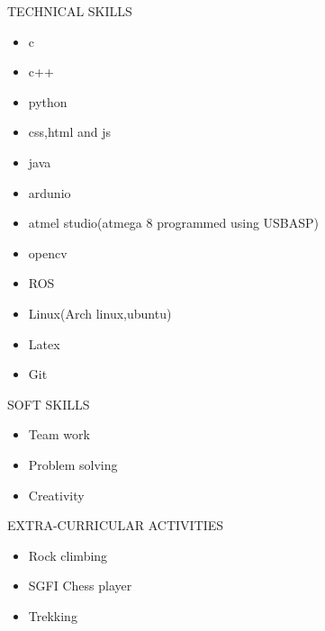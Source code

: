 \documentclass[10pt]{article}
\begin{document}
		
	\begin{minipage}[t][4cm][t]{0.2\textwidth}
		TECHNICAL SKILLS
		
	\end{minipage}
	\begin{minipage}[t][4cm][t]{0.8\textwidth}
		\begin{itemize}
			\item c
			\item c++
			\item python
			\item css,html and js
			\item java
			\item ardunio
			\item atmel studio(atmega 8 programmed using USBASP)
			\item opencv
			\item ROS
			\item Linux(Arch linux,ubuntu)
			\item Latex
			\item Git
		\end{itemize}
		
	\end{minipage}




		
	\begin{minipage}[t][2cm][t]{0.2\textwidth}
		SOFT SKILLS
		
	\end{minipage}
	\begin{minipage}[t][2cm][t]{0.8\textwidth}
		\begin{itemize}
			\item Team work
			\item Problem solving
			\item Creativity
		\end{itemize}
		
	\end{minipage}



		
	\begin{minipage}[t][2cm][t]{0.2\textwidth}
		EXTRA-CURRICULAR ACTIVITIES
		
	\end{minipage}
	\begin{minipage}[t][2cm][t]{0.8\textwidth}
	\begin{itemize}
		\item Rock climbing
		\item SGFI Chess player
		\item Trekking
	\end{itemize}
		
	\end{minipage}
\end{document}
